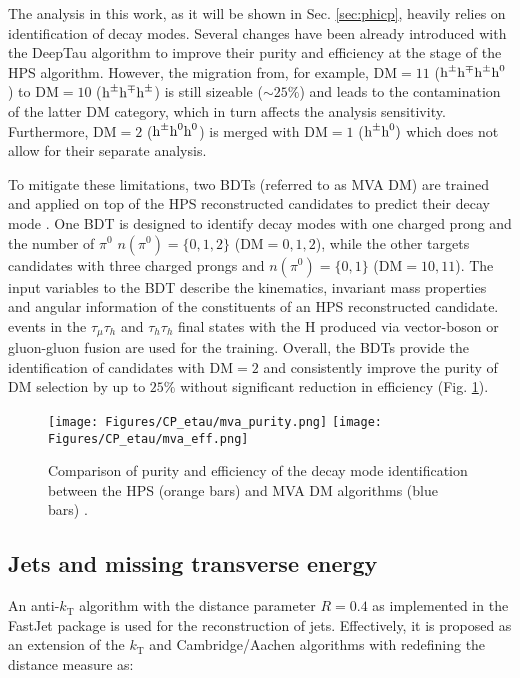 The analysis in this work, as it will be shown in Sec. \ref{sec:phicp}, heavily relies on identification of \tauh decay modes. Several changes have been already introduced with the DeepTau algorithm to improve their purity and efficiency at the stage of the HPS algorithm. However, the migration from, for example, $\text{DM}=11$ ($\text{h}^\pm\text{h}^\mp\text{h}^\pm\text{h}^0$) to $\text{DM}=10$ ($\text{h}^\pm\text{h}^\mp\text{h}^\pm$) is still sizeable ($\sim25\%$) and leads to the contamination of the latter DM category, which in turn affects the analysis sensitivity. Furthermore, $\text{DM}=2$ ($\text{h}^\pm\text{h}^0\text{h}^0$) is merged with $\text{DM}=1$ ($\text{h}^\pm\text{h}^0)$ which does not allow for their separate analysis. 

To mitigate these limitations, two BDTs (referred to as MVA DM) are trained and applied on top of the HPS reconstructed \tauh candidates to predict their decay mode \cite{CMS-DP-2020-041}. One BDT is designed to identify decay modes with one charged prong and the number of $\pi^0$ $n(\pi^0) = \{0,1,2\}$ ($\text{DM}=0,1,2$), while the other targets \tauh candidates with three charged prongs and $n(\pi^0) = \{0,1\}$ ($\text{DM}=10,11$). The input variables to the BDT describe the kinematics, invariant mass properties and angular information of the constituents of an HPS reconstructed \tauh candidate. \htt events in the $\tau_\mu\tau_h$ and $\tau_h\tau_h$ final states with the H produced via vector-boson or gluon-gluon fusion are used for the training. Overall, the BDTs provide the identification of \tauh candidates with $\text{DM}=2$ and consistently improve the purity of DM selection by up to $25\%$ without significant reduction in efficiency (Fig. \ref{fig:mva_dm}).  

\begin{figure}[t!]
    \centering
    \texttt{[image: Figures/CP\_etau/mva\_purity.png]}
    \texttt{[image: Figures/CP\_etau/mva\_eff.png]}
    \caption{Comparison of purity and efficiency of the \tauh decay mode identification between the HPS (orange bars) and MVA DM algorithms (blue bars) \cite{CMS-DP-2020-041}.}
    \label{fig:mva_dm}
\end{figure}



\subsection{Jets and missing transverse energy}\label{sec:jets}
An anti-$k_\text{T}$ algorithm \cite{Cacciari:2008gp} with the distance parameter $R=0.4$ as implemented in the FastJet package \cite{Cacciari:2011ma} is used for the reconstruction of jets. Effectively, it is proposed as an extension of the $k_\text{T}$ \cite{Ellis:1993tq} and Cambridge/Aachen \cite{Wobisch:1998wt} algorithms with redefining the distance measure as:

